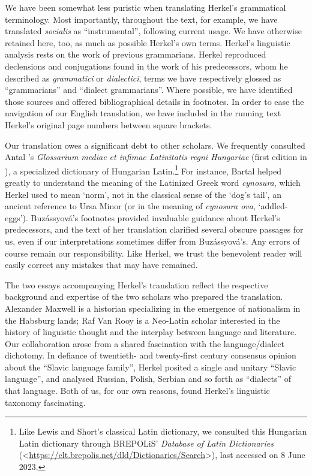 We have been somewhat less puristic when translating Herkel’s grammatical terminology. Most importantly, throughout the text, for example, we have translated \textit{socialis} as “instrumental”, following current usage. We have otherwise retained here, too, as much as possible Herkel’s own terms. Herkel’s linguistic analysis rests on the work of previous grammarians. Herkel reproduced declensions and conjugations found in the work of his predecessors, whom he described as \textit{grammatici} or \textit{dialectici}, terms we have respectively glossed as “grammarians” and “dialect grammarians”. Where possible, we have identified those sources and offered bibliographical details in footnotes. In order to ease the navigation of our English translation, we have included in the running text Herkel’s original page numbers between square brackets.

Our translation owes a significant debt to other scholars. We frequently consulted Antal \citeauthor{bartal_glossarium_1901}’s \textit{Glossarium mediae et infimae Latinitatis regni Hungariae} (first edition in \citeyear{bartal_glossarium_1901}), a specialized dictionary of Hungarian Latin.\footnote{Like Lewis and Short’s classical Latin dictionary, we consulted this Hungarian Latin dictionary through \textsc{BREPOL}iS’ \textit{Database of Latin Dictionaries} (<\url{https://clt.brepolis.net/dld/Dictionaries/Search}>), last accessed on 8 June 2023.} For instance, Bartal helped greatly to understand the meaning of the Latinized Greek word \textit{cynosura}, which Herkel used to mean ‘norm’, not in the classical sense of the ‘dog’s tail’, an ancient reference to Ursa Minor (or in the meaning of \textit{cynosura ova}, ‘addled-eggs’). Buzássyová’s footnotes provided invaluable guidance about Herkel’s predecessors, and the text of her translation clarified several obscure passages for us, even if our interpretations sometimes differ from Buzássyová’s. Any errors of course remain our responsibility. Like Herkel, we trust the benevolent reader will easily correct any mistakes that may have remained.

The two essays accompanying Herkel’s translation reflect the respective background and expertise of the two scholars who prepared the translation. Alexander Maxwell is a historian specializing in the emergence of nationalism in the Habsburg lands; Raf Van Rooy is a Neo-Latin scholar interested in the history of linguistic thought and the interplay between language and literature. Our collaboration arose from a shared fascination with the  language/dialect dichotomy. In defiance of twentieth- and twenty-first century consensus opinion about the “Slavic language family”, Herkel posited a single and unitary “Slavic language”, and analysed Russian, Polish, Serbian and so forth as “dialects” of that language. Both of us, for our own reasons, found Herkel’s linguistic taxonomy fascinating.

